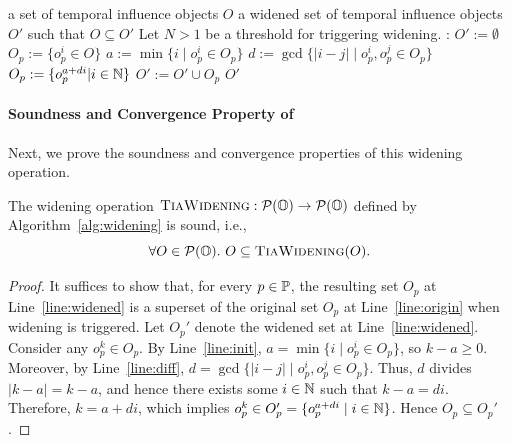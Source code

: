 \begin{algorithm}[tp]
    \caption{Widening Operation for \tia}\label{alg:widening}
    \begin{algorithmic}[1]
        \Require a set of temporal influence objects $O$
        \Ensure a widened set of temporal influence objects $O'$ such that $O \subseteq O'$
        \State Let $N > 1$ be a threshold for triggering widening.
        :
        \State $O' := \emptyset$
        \label{line:port}
        \State $O_p := \{o_p^i \in O\}$ \label{line:origin}
         \label{line:threshold}
        \State $a := \min\{i \mid o_p^i \in O_p\}$ \label{line:init}
        \State $d := \gcd\{ |i - j | \mid o_p^i, o_p^j \in O_p\}$ \label{line:diff}
        \State $O_p := \{o_p^{a + di} | i\in \mathbb{N}\}$ \label{line:widened}
        \EndIf
        \State $O' := O' \cup O_p$
        \EndFor
        \State \Return $O'$
        \EndProcedure
    \end{algorithmic}
\end{algorithm}

\paragraph{Soundness and Convergence Property of \widening}

Next, we prove the soundness and convergence properties of this widening operation.

\begin{theorem}\label{theo:widening-soundness}
    The widening operation $\textsc{TiaWidening} : \mathcal{P}(\mathbb{O}) \to \mathcal{P}(\mathbb{O})$ defined by Algorithm~\ref{alg:widening} is sound, i.e.,
    \[
    \forall O \in \mathcal{P}(\mathbb{O}).\ O \subseteq \textsc{TiaWidening}(O).
    \]
\end{theorem}
\begin{proof}
    It suffices to show that, for every $p \in \mathbb{P}$, the resulting set $O_p$ at Line~\ref{line:widened} is a superset of the original set $O_p$ at Line~\ref{line:origin} when widening is triggered.
    Let $O_p'$ denote the widened set at Line~\ref{line:widened}.
    Consider any $o_p^k \in O_p$.
    By Line~\ref{line:init}, $a = \min\{i \mid o_p^i \in O_p\}$, so $k-a \ge 0$.
    Moreover, by Line~\ref{line:diff}, $d = \gcd\{ |i-j| \mid o_p^i,o_p^j \in O_p\}$.
    Thus, $d$ divides $|k-a| = k-a$, and hence there exists some
    $i \in \mathbb{N}$ such that $k-a = di$.
    Therefore, $k = a + di$, which implies $o_p^k \in O_p'
    = \{o_p^{a+di} \mid i \in \mathbb{N}\}$.
    Hence $O_p \subseteq O_p'$.
\end{proof}

